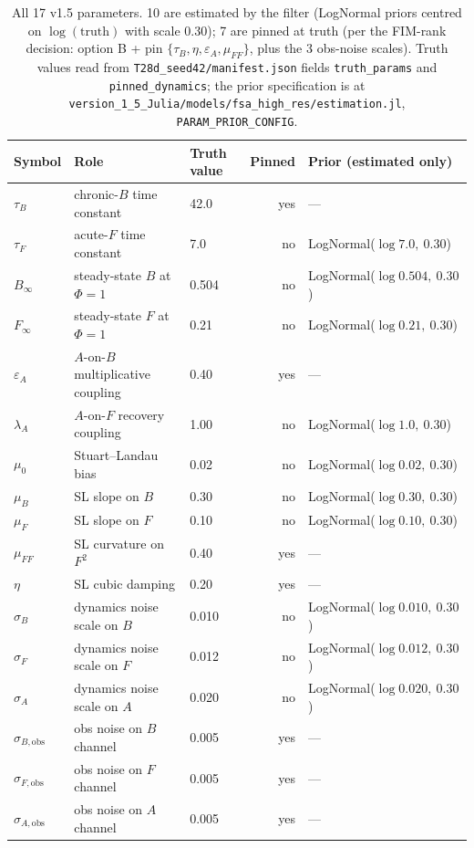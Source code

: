 \documentclass[11pt,a4paper]{article}
\begin{document}
\begin{table}[ht]
\centering
\small
\begin{tabular}{lllrl}
\toprule
Symbol & Role & Truth value & Pinned & Prior (estimated only) \\
\midrule
$\tau_B$            & chronic-$B$ time constant   & 42.0    & yes & --- \\
$\tau_F$            & acute-$F$ time constant     & 7.0     & no  & LogNormal($\log 7.0,\ 0.30$) \\
$B_\infty$          & steady-state $B$ at $\Phi=1$ & 0.504   & no  & LogNormal($\log 0.504,\ 0.30$) \\
$F_\infty$          & steady-state $F$ at $\Phi=1$ & 0.21    & no  & LogNormal($\log 0.21,\ 0.30$) \\
$\varepsilon_A$     & $A$-on-$B$ multiplicative coupling & 0.40 & yes & --- \\
$\lambda_A$         & $A$-on-$F$ recovery coupling & 1.00    & no  & LogNormal($\log 1.0,\ 0.30$) \\
$\mu_0$             & Stuart--Landau bias         & 0.02    & no  & LogNormal($\log 0.02,\ 0.30$) \\
$\mu_B$             & SL slope on $B$             & 0.30    & no  & LogNormal($\log 0.30,\ 0.30$) \\
$\mu_F$             & SL slope on $F$             & 0.10    & no  & LogNormal($\log 0.10,\ 0.30$) \\
$\mu_{FF}$          & SL curvature on $F^2$       & 0.40    & yes & --- \\
$\eta$              & SL cubic damping            & 0.20    & yes & --- \\
$\sigma_B$          & dynamics noise scale on $B$ & 0.010   & no  & LogNormal($\log 0.010,\ 0.30$) \\
$\sigma_F$          & dynamics noise scale on $F$ & 0.012   & no  & LogNormal($\log 0.012,\ 0.30$) \\
$\sigma_A$          & dynamics noise scale on $A$ & 0.020   & no  & LogNormal($\log 0.020,\ 0.30$) \\
\midrule
$\sigma_{B,\mathrm{obs}}$ & obs noise on $B$ channel & 0.005 & yes & --- \\
$\sigma_{F,\mathrm{obs}}$ & obs noise on $F$ channel & 0.005 & yes & --- \\
$\sigma_{A,\mathrm{obs}}$ & obs noise on $A$ channel & 0.005 & yes & --- \\
\bottomrule
\end{tabular}
\caption{All 17 v1.5 parameters. 10 are estimated by the filter
(LogNormal priors centred on $\log(\text{truth})$ with scale $0.30$);
7 are pinned at truth (per the FIM-rank decision: option B + pin
$\{\tau_B, \eta, \varepsilon_A, \mu_{FF}\}$, plus the 3 obs-noise
scales). Truth values read from \texttt{T28d\_seed42/manifest.json}
fields \texttt{truth\_params} and \texttt{pinned\_dynamics}; the prior
specification is at
\texttt{version\_1\_5\_Julia/models/fsa\_high\_res/estimation.jl},
\texttt{PARAM\_PRIOR\_CONFIG}.}
\label{tab:params}
\end{table}
\end{document}
